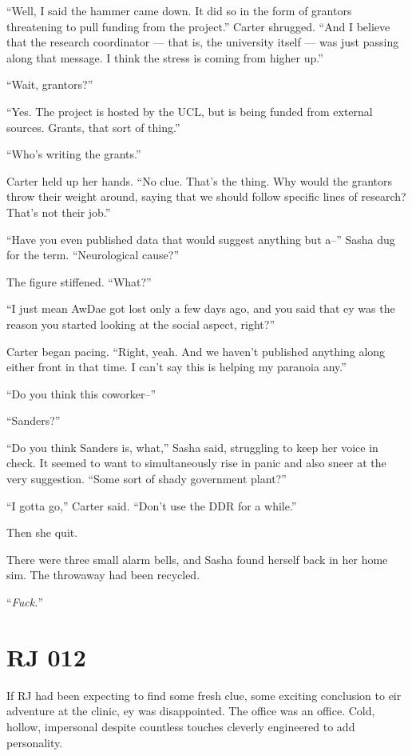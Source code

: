 ``Well, I said the hammer came down. It did so in the form of grantors threatening to pull funding from the project.'' Carter shrugged. ``And I believe that the research coordinator --- that is, the university itself --- was just passing along that message. I think the stress is coming from higher up.''

``Wait, grantors?''

``Yes. The project is hosted by the UCL, but is being funded from external sources. Grants, that sort of thing.''

``Who's writing the grants.''

Carter held up her hands. ``No clue. That's the thing. Why would the grantors throw their weight around, saying that we should follow specific lines of research? That's not their job.''

``Have you even published data that would suggest anything but a--'' Sasha dug for the term. ``Neurological cause?''

The figure stiffened. ``What?''

``I just mean AwDae got lost only a few days ago, and you said that ey was the reason you started looking at the social aspect, right?''

Carter began pacing. ``Right, yeah. And we haven't published anything along either front in that time. I can't say this is helping my paranoia any.''

``Do you think this coworker--''

``Sanders?''

``Do you think Sanders is, what,'' Sasha said, struggling to keep her voice in check. It seemed to want to simultaneously rise in panic and also sneer at the very suggestion. ``Some sort of shady government plant?''

``I gotta go,'' Carter said. ``Don't use the DDR for a while.''

Then she quit.

There were three small alarm bells, and Sasha found herself back in her home sim. The throwaway had been recycled.

``\emph{Fuck.}''

\chapter*{RJ 012}

If RJ had been expecting to find some fresh clue, some exciting conclusion to eir adventure at the clinic, ey was disappointed. The office was an office. Cold, hollow, impersonal despite countless touches cleverly engineered to add personality.

